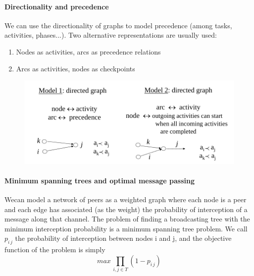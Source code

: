 \documentclass{article}
\begin{document}
			\paragraph{Directionality and precedence}
				We can use the directionality of graphs to model precedence (among tasks, activities, phases...). Two alternative representations are usually used:
				\begin{enumerate}
					\item Nodes as activities, arcs as precedence relations
					\item Arcs as activities, nodes as checkpoints
				\end{enumerate}
				\begin{figure}[H]
					\centering
					\includegraphics[width = \textwidth]{./images/Precedence.png}
				\end{figure}

			\paragraph{Minimum spanning trees and optimal message passing}
				Wecan model a network of peers as a weighted graph where each node is a peer and each edge has associated (as the weight) the probability of interception of a message along that channel. The problem of finding a broadcasting tree with the minimum interception probability is a minimum spanning tree problem. We call $p_{i\, j}$ the probability of interception between nodes i and j, and the objective function of the problem is simply
				\begin{equation}
					max\, \prod_{i, j \in T} (1 - p_{i\, j})
				\end{equation}
\end{document}
